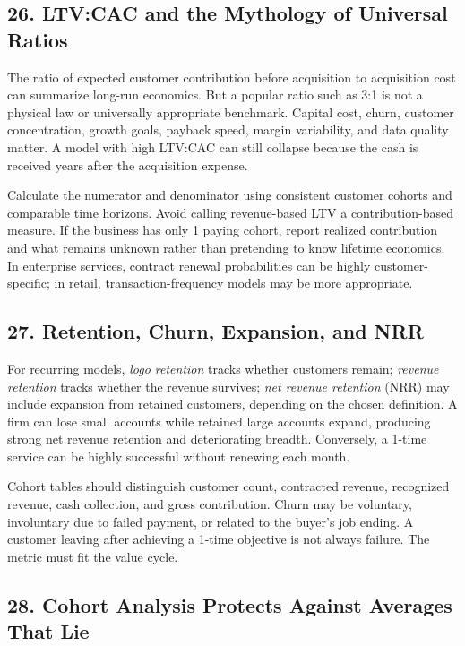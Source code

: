\subsection*{26. LTV:CAC and the Mythology of Universal Ratios}

The ratio of expected customer contribution before acquisition to acquisition cost can summarize long-run economics. But a popular ratio such as 3:1 is not a physical law or universally appropriate benchmark. Capital cost, churn, customer concentration, growth goals, payback speed, margin variability, and data quality matter. A model with high LTV:CAC can still collapse because the cash is received years after the acquisition expense.

Calculate the numerator and denominator using consistent customer cohorts and comparable time horizons. Avoid calling revenue-based LTV a contribution-based measure. If the business has only 1 paying cohort, report realized contribution and what remains unknown rather than pretending to know lifetime economics. In enterprise services, contract renewal probabilities can be highly customer-specific; in retail, transaction-frequency models may be more appropriate.

\subsection*{27. Retention, Churn, Expansion, and NRR}

For recurring models, \emph{logo retention} tracks whether customers remain; \emph{revenue retention} tracks whether the revenue survives; \emph{net revenue retention} (NRR) may include expansion from retained customers, depending on the chosen definition. A firm can lose small accounts while retained large accounts expand, producing strong net revenue retention and deteriorating breadth. Conversely, a 1-time service can be highly successful without renewing each month.

Cohort tables should distinguish customer count, contracted revenue, recognized revenue, cash collection, and gross contribution. Churn may be voluntary, involuntary due to failed payment, or related to the buyer's job ending. A customer leaving after achieving a 1-time objective is not always failure. The metric must fit the value cycle.

\subsection*{28. Cohort Analysis Protects Against Averages That Lie}

